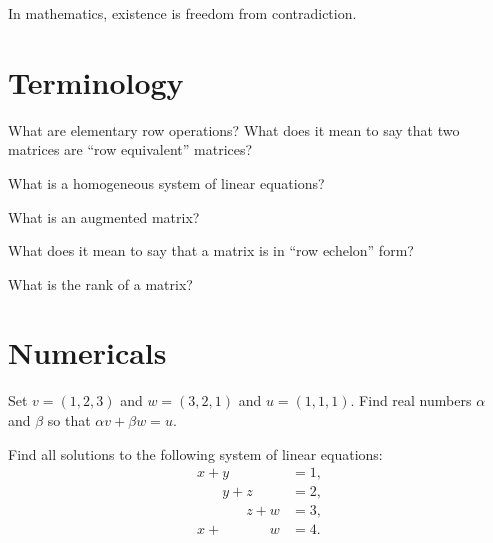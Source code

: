 \documentclass{homework}
\author{Jim Fowler}
\begin{document}
\maketitle

\begin{inspiration}
In mathematics, existence is freedom from contradiction.
\end{inspiration}

\section{Terminology}

\begin{problem}
  What are elementary row operations?  What does it mean to say that
  two matrices are ``row equivalent'' matrices?
\end{problem}

\begin{problem}
  What is a homogeneous system of linear equations?
\end{problem}

\begin{problem}
  What is an augmented matrix?
\end{problem}

\begin{problem}
  What does it mean to say that a matrix is in ``row echelon'' form?
\end{problem}

\begin{problem}
  What is the rank of a matrix?
\end{problem}

\section{Numericals}

\begin{problem}
  Set $v = (1,2,3)$ and $w = (3,2,1)$ and $u = (1,1,1)$.  Find real
  numbers $\alpha$ and $\beta$ so that $\alpha v + \beta w = u$.
\end{problem}

\begin{problem}
  Find all solutions to the following system of linear equations:
  \begin{align*}
    \phantom{}x+y\phantom{+z+w} &= 1, \\
    \phantom{x+}y+z\phantom{+w} &= 2, \\
    \phantom{x+y+}z+w\phantom{} &= 3, \\
    x+\phantom{y+z+}w\phantom{} &= 4. \\    
  \end{align*}
\end{problem}
\end{document}
